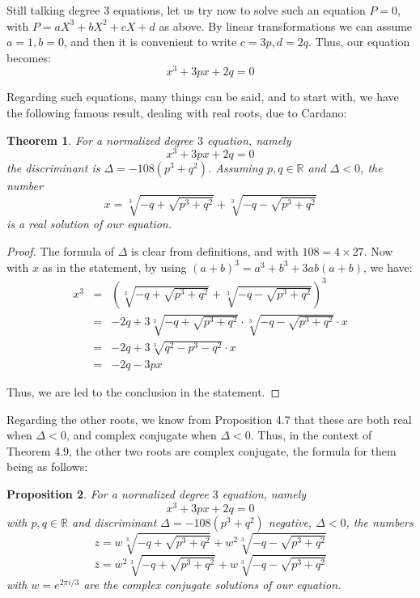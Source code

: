 \documentclass[12pt]{amsbook}
\newtheorem{theorem}{Theorem}[chapter]
\newtheorem{proposition}[theorem]{Proposition}
\begin{document}
Still talking degree 3 equations, let us try now to solve such an equation $P=0$, with $P=aX^3+bX^2+cX+d$ as above. By linear transformations we can assume $a=1,b=0$, and then it is convenient to write $c=3p,d=2q$. Thus, our equation becomes:
$$x^3+3px+2q=0$$

Regarding such equations, many things can be said, and to start with, we have the following famous result, dealing with real roots, due to Cardano:


\begin{theorem}
For a normalized degree $3$ equation, namely 
$$x^3+3px+2q=0$$
the discriminant is $\Delta=-108(p^3+q^2)$. Assuming $p,q\in\mathbb R$ and $\Delta<0$, the number
$$x=\sqrt[3]{-q+\sqrt{p^3+q^2}}+\sqrt[3]{-q-\sqrt{p^3+q^2}}$$
is a real solution of our equation.
\end{theorem}

\begin{proof}
The formula of $\Delta$ is clear from definitions, and with $108=4\times 27$. Now with $x$ as in the statement, by using $(a+b)^3=a^3+b^3+3ab(a+b)$, we have:
\begin{eqnarray*}
x^3
&=&\left(\sqrt[3]{-q+\sqrt{p^3+q^2}}+\sqrt[3]{-q-\sqrt{p^3+q^2}}\right)^3\\
&=&-2q+3\sqrt[3]{-q+\sqrt{p^3+q^2}}\cdot\sqrt[3]{-q-\sqrt{p^3+q^2}}\cdot x\\
&=&-2q+3\sqrt[3]{q^2-p^3-q^2}\cdot x\\
&=&-2q-3px
\end{eqnarray*}

Thus, we are led to the conclusion in the statement.
\end{proof}

Regarding the other roots, we know from Proposition 4.7 that these are both real when $\Delta<0$, and complex conjugate when $\Delta<0$. Thus, in the context of Theorem 4.9, the other two roots are complex conjugate, the formula for them being as follows:


\begin{proposition}
For a normalized degree $3$ equation, namely 
$$x^3+3px+2q=0$$
with $p,q\in\mathbb R$ and discriminant $\Delta=-108(p^3+q^2)$ negative, $\Delta<0$, the numbers
$$z=w\sqrt[3]{-q+\sqrt{p^3+q^2}}+w^2\sqrt[3]{-q-\sqrt{p^3+q^2}}$$
$$\bar{z}=w^2\sqrt[3]{-q+\sqrt{p^3+q^2}}+w\sqrt[3]{-q-\sqrt{p^3+q^2}}$$
with $w=e^{2\pi i/3}$ are the complex conjugate solutions of our equation.
\end{proposition}
\end{document}
